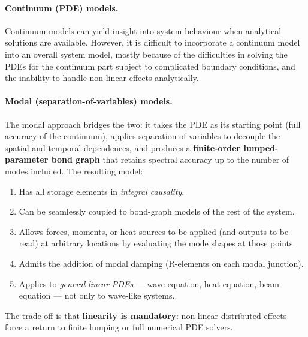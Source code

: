 \paragraph{Continuum (PDE) models.}
Continuum models can yield insight into system behaviour when analytical solutions
are available.  However, it is difficult to incorporate a continuum model into an
overall system model, mostly because of the difficulties in solving the PDEs for
the continuum part subject to complicated boundary conditions, and the inability
to handle non-linear effects analytically.

\paragraph{Modal (separation-of-variables) models.}
The modal approach bridges the two: it takes the PDE as its starting point (full
accuracy of the continuum), applies separation of variables to decouple the
spatial and temporal dependences, and produces a \textbf{finite-order
lumped-parameter bond graph} that retains spectral accuracy up to the number of
modes included.  The resulting model:
\begin{enumerate}[leftmargin=2em,itemsep=2pt]
  \item Has all storage elements in \emph{integral causality}.
  \item Can be seamlessly coupled to bond-graph models of the rest of the system.
  \item Allows forces, moments, or heat sources to be applied (and outputs to be
    read) at arbitrary locations by evaluating the mode shapes at those points.
  \item Admits the addition of modal damping (R-elements on each modal junction).
  \item Applies to \emph{general linear PDEs} --- wave equation, heat equation,
    beam equation --- not only to wave-like systems.
\end{enumerate}
The trade-off is that \textbf{linearity is mandatory}: non-linear distributed
effects force a return to finite lumping or full numerical PDE solvers.